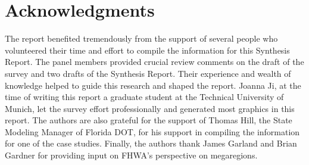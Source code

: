 \chapter*{Acknowledgments}

The report benefited tremendously from the support of several people who volunteered their time and effort to compile the information for this Synthesis Report. The panel members provided crucial review comments on the draft of the survey and two drafts of the Synthesis Report. Their experience and wealth of knowledge helped to guide this research and shaped the report. Joanna Ji, at the time of writing this report a graduate student at the Technical University of Munich, let the survey effort professionally and generated most graphics in this report. The authors are also grateful for the support of Thomas Hill, the State Modeling Manager of Florida DOT, for his support in compiling the information for one of the case studies. Finally, the authors thank James Garland and Brian Gardner for providing input on FHWA's perspective on megaregions.